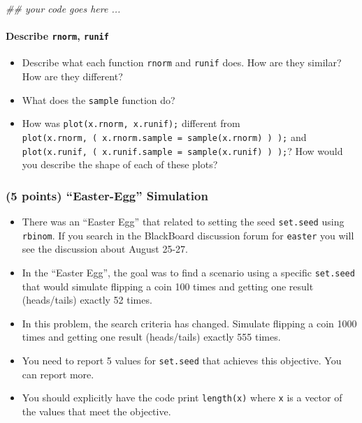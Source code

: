 \documentclass[
]{article}
\newenvironment{Shaded}{\begin{snugshade}}{\end{snugshade}}
\newcommand{\CommentTok}[1]{\textcolor[rgb]{0.56,0.35,0.01}{\textit{#1}}}
\providecommand{\tightlist}{%
  \setlength{\itemsep}{0pt}\setlength{\parskip}{0pt}}
\begin{document}
\begin{Shaded}
\begin{Highlighting}[]
\CommentTok{\#\# your code goes here ...}
\end{Highlighting}
\end{Shaded}

\hypertarget{describe-rnorm-runif}{%
\paragraph{\texorpdfstring{\textbf{Describe \texttt{rnorm},
\texttt{runif}}}{Describe rnorm, runif}}\label{describe-rnorm-runif}}

\begin{itemize}
\tightlist
\item
  Describe what each function \texttt{rnorm} and \texttt{runif} does.
  How are they similar? How are they different?\\
\item
  What does the \texttt{sample} function do?
\item
  How was \texttt{plot(x.rnorm,\ x.runif);} different from
  \texttt{plot(x.rnorm,\ (\ x.rnorm.sample\ =\ sample(x.rnorm)\ )\ );}
  and
  \texttt{plot(x.runif,\ (\ x.runif.sample\ =\ sample(x.runif)\ )\ );}?
  How would you describe the shape of each of these plots?
\end{itemize}

\hypertarget{points-easter-egg-simulation}{%
\subsubsection{(5 points) ``Easter-Egg''
Simulation}\label{points-easter-egg-simulation}}

\begin{itemize}
\tightlist
\item
  There was an ``Easter Egg'' that related to setting the seed
  \texttt{set.seed} using \texttt{rbinom}. If you search in the
  BlackBoard discussion forum for \texttt{easter} you will see the
  discussion about August 25-27.
\item
  In the ``Easter Egg'', the goal was to find a scenario using a
  specific \texttt{set.seed} that would simulate flipping a coin 100
  times and getting one result (heads/tails) exactly 52 times.
\item
  In this problem, the search criteria has changed. Simulate flipping a
  coin 1000 times and getting one result (heads/tails) exactly 555
  times.
\item
  You need to report 5 values for \texttt{set.seed} that achieves this
  objective. You can report more.\\
\item
  You should explicitly have the code print \texttt{length(x)} where
  \texttt{x} is a vector of the values that meet the objective.
\end{itemize}
\end{document}
